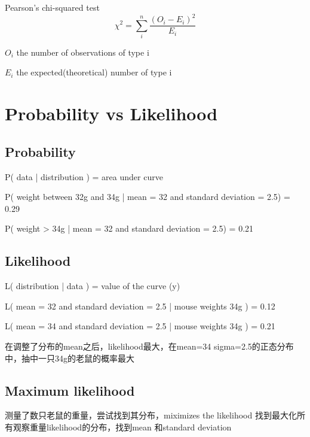 \documentclass[11pt]{article}
\begin{document}
Pearson's chi-squared test
\begin{equation*}
    \chi^2 = \sum_i^n \frac{(O_i - E_i)^2}{E_i}
\end{equation*}

\begin{list}{-}{}
    \item $O_i$ the number of observations of type i
    \item $E_i$ the expected(theoretical) number of type i
\end{list}

\section{Probability vs Likelihood}

\subsection{Probability}

P( data | distribution ) = area under curve

P( weight between 32g and 34g | mean = 32 and standard deviation = 2.5) = 0.29

P( weight > 34g | mean = 32 and standard deviation = 2.5) = 0.21

\subsection{Likelihood}

L( distribution | data ) = value of the curve (y)

L( mean = 32 and standard deviation = 2.5 | mouse weights 34g ) = 0.12

L( mean = 34 and standard deviation = 2.5 | mouse weights 34g ) = 0.21

在调整了分布的mean之后，likelihood最大，在mean=34 sigma=2.5的正态分布中，抽中一只34g的老鼠的概率最大

\subsection{Maximum likelihood}

测量了数只老鼠的重量，尝试找到其分布，miximizes the likelihood 找到最大化所有观察重量likelihood的分布，找到mean 和standard deviation
\end{document}
